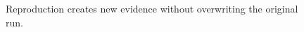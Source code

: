 \begin{figure}[H]
\centering
{}
\caption{Reproduction creates new evidence without overwriting the original run.}\label{fig:gap-execution-reproduce}
\end{figure}

